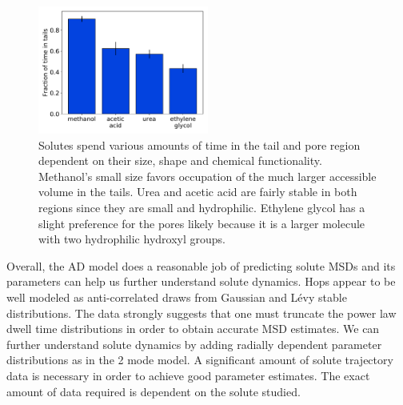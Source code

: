 \documentclass[12pt]{article}
\begin{document}
  \begin{figure}
  \centering
  \includegraphics[width=0.5\textwidth]{AD_mode_occupation.pdf}
  \caption{Solutes spend various amounts of time in the tail and pore region dependent
  on their size, shape and chemical functionality. Methanol's small size favors 
  occupation of the much larger accessible volume in the tails. Urea and acetic acid
  are fairly stable in both regions since they are small and hydrophilic. Ethylene 
  glycol has a slight preference for the pores likely because it is a larger
  molecule with two hydrophilic hydroxyl groups.}\label{fig:AD_mode_occupation}
  \end{figure}
  
  Overall, the AD model does a reasonable job of predicting solute MSDs and its 
  parameters can help us further understand solute dynamics. Hops appear to be well
  modeled as anti-correlated draws from Gaussian and L\'evy stable distributions. 
  The data strongly suggests that one must truncate the power law dwell time 
  distributions in order to obtain accurate MSD estimates. We can further understand
  solute dynamics by adding radially dependent parameter distributions as in the 
  2 mode model. A significant amount of solute trajectory data is necessary 
  in order to achieve good parameter estimates. The exact amount of data required 
  is dependent on the solute studied. 
  
  
\end{document}

